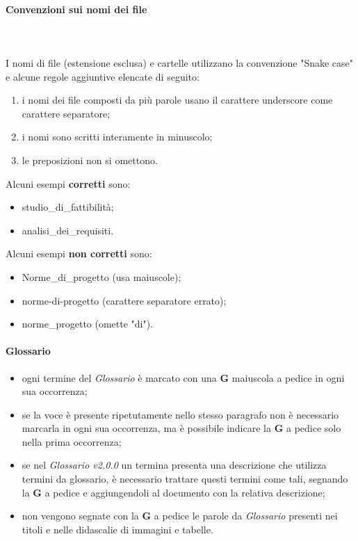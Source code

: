 		\paragraph{Convenzioni sui nomi dei file} \mbox{}\\ \mbox{}\\
		I nomi di file (estensione esclusa) e cartelle utilizzano la convenzione "Snake case\glo" e alcune regole aggiuntive elencate di seguito:
		\begin{enumerate}
			\item i nomi dei file composti da più parole usano il carattere underscore come carattere separatore;
			\item i nomi sono scritti interamente in minuscolo;
			\item le preposizioni non si omettono.
		\end{enumerate}
		Alcuni esempi \textbf{corretti} sono:
		\begin{itemize}
			\item studio\_di\_fattibilità;
			\item analisi\_dei\_requisiti.
		\end{itemize}	 	
		Alcuni esempi \textbf{non corretti} sono: 
		\begin{itemize}
			\item Norme\_di\_progetto (usa maiuscole);
			\item norme-di-progetto (carattere separatore errato);
			\item norme\_progetto (omette "di").
		\end{itemize}
		\paragraph{Glossario}
		\begin{itemize}
			\item ogni termine del \textit{Glossario} è marcato con una \textbf{G} maiuscola a pedice in ogni sua occorrenza;
			\item se la voce è presente ripetutamente nello stesso paragrafo non è necessario marcarla in ogni sua occorrenza, ma è possibile indicare la \textbf{G} a pedice solo nella prima occorrenza;
			\item se nel \textit{Glossario v2.0.0} un termina presenta una descrizione che utilizza termini da glossario, è necessario trattare questi termini come tali, segnando la \textbf{G} a pedice e aggiungendoli al documento con la relativa descrizione;
			\item non vengono segnate con la \textbf{G} a pedice  le parole da \textit{Glossario} presenti nei titoli e nelle didascalie di immagini e tabelle.
		\end{itemize}			
